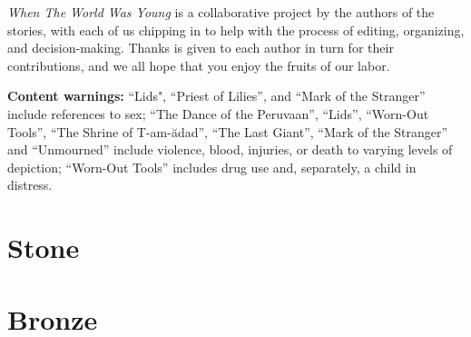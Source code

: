 \documentclass[11pt]{memoir}
\begin{document}
  \newpage

  

  \newpage
  \null
  \cleardoublepage
  \tableofcontents*
  \newpage
  \null
  \cleardoublepage

  \null
  \vfill
  
  \noindent\emph{When The World Was Young} is a collaborative project by the authors of the stories, with each of us chipping in to help with the process of editing, organizing, and decision-making. Thanks is given to each author in turn for their contributions, and we all hope that you enjoy the fruits of our labor.

  \vfill

  \noindent\textbf{Content warnings:} ``Lids", ``Priest of Lilies'', and ``Mark of the Stranger'' include references to sex; ``The Dance of the Peruvaan'', ``Lids'', ``Worn-Out Tools'', ``The Shrine of T-am-ădad'', ``The Last Giant'', ``Mark of the Stranger'' and ``Unmourned'' include violence, blood, injuries, or death to varying levels of depiction; ``Worn-Out Tools'' includes drug use and, separately, a child in distress.

  \mainmatter

  \pagestyle{ourbook}

  \part*{Stone}
  \thispagestyle{empty}
	
  
  
  \storydiv
	
  
  
  \storydiv
  
  
  
  \storydiv
	
  
  
  \storydiv
  
	
	
  \storydiv

  
  
  \storydiv

  \part*{Bronze}
  \thispagestyle{empty}
  
\end{document}

